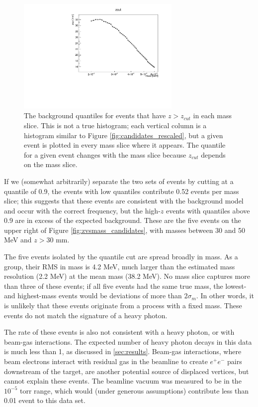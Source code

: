 \begin{figure}[ht]
\begin{center}
    \includegraphics[width=0.7\textwidth,page=7,angle=-90]{vertexing/figs/golden_mres_output}
\end{center}
\caption{The background quantiles for events that have $z>z_{cut}$ in each mass slice.
This is not a true histogram; each vertical column is a histogram similar to Figure \ref{fig:candidates_rescaled}, but a given event is plotted in every mass slice where it appears.
The quantile for a given event changes with the mass slice because $z_{cut}$ depends on the mass slice.
}
    \label{fig:zvsmass_candidates_rescaled}
\end{figure}

If we (somewhat arbitrarily) separate the two sets of events by cutting at a quantile of 0.9, the events with low quantiles contribute 0.52 events per mass slice; this suggests that these events are consistent with the background model and occur with the correct frequency, but the high-$z$ events with quantiles above 0.9 are in excess of the expected background.
These are the five events on the upper right of Figure \ref{fig:zvsmass_candidates}, with masses between 30 and 50 MeV and $z>30$ mm.

The five events isolated by the quantile cut are spread broadly in mass.
As a group, their RMS in mass is 4.2 MeV, much larger than the estimated mass resolution (2.2 MeV) at the mean mass (38.2 MeV).
No mass slice captures more than three of these events; if all five events had the same true mass, the lowest- and highest-mass events would be deviations of more than $2\sigma_m$.
In other words, it is unlikely that these events originate from a process with a fixed mass.
These events do not match the signature of a heavy photon.

The rate of these events is also not consistent with a heavy photon, or with beam-gas interactions.
The expected number of heavy photon decays in this data is much less than 1, as discussed in \ref{sec:results}.
Beam-gas interactions, where beam electrons interact with residual gas in the beamline to create $e^+e^-$ pairs downstream of the target, are another potential source of displaced vertices, but cannot explain these events.
The beamline vacuum was measured to be in the $10^{-5}$ torr range, which would (under generous assumptions) contribute less than 0.01 event to this data set.

